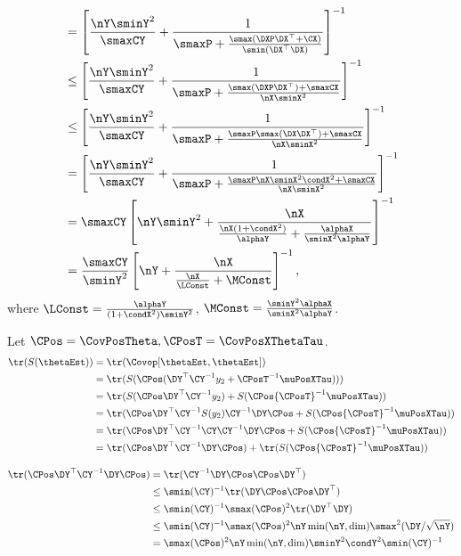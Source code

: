 \begin{align}
&= \left[ \frac{\nY\sminY^2}{\smaxCY} + \frac{1}{\smaxP + \frac{\smax(\DXP\DX^\top + \CX)}{\smin(\DX^\top \DX)}} \right]^{-1} \\
&\le \left[ \frac{\nY\sminY^2}{\smaxCY} + \frac{1}{\smaxP +\frac{\smax(\DXP\DX^\top) +\smaxCX}{\nX \sminX^2}} \right]^{-1} \\
&\le \left[ \frac{\nY\sminY^2}{\smaxCY} + \frac{1}{\smaxP +\frac{\smaxP\smax(\DX\DX^\top) + \smaxCX}{\nX \sminX^2}} \right]^{-1} \\
&= \left[ \frac{\nY\sminY^2}{\smaxCY} + \frac{1}{\smaxP +\frac{\smaxP\nX \sminX^2 \condX^2 + \smaxCX}{\nX \sminX^2}} \right]^{-1} \\
&=\smaxCY
\left[ \nY\sminY^2 + 
\frac{\nX}{\frac{\nX (1+\condX^2)}{\alphaY} + \frac{\alphaX}{\sminX^2 \alphaY}} \right]^{-1} \\
&=\frac{\smaxCY}{\sminY^2}
\left[ \nY + 
\frac{\nX}{\frac{\nX}{\LConst} + \MConst} \right]^{-1},
\end{align}
where $\LConst = \frac{\alphaY}{(1 + \condX^2)\sminY^2}$, $\MConst = \frac{\sminY^2 \alphaX}{\sminX^2 \alphaY}$.

Let $\CPos = \CovPosTheta, \CPosT = \CovPosXThetaTau$.
\begin{align}
\tr(S(\thetaEst)) &= \tr(\Covop [\thetaEst, \thetaEst]) \\
&=\tr(S(\CPos (\DY^\top \CY^{-1} y_2 + {\CPosT}^{-1} \muPosXTau)))\\
&=\tr(S(\CPos \DY^\top \CY^{-1} y_2) + S(\CPos {\CPosT}^{-1}  \muPosXTau))\\
&=\tr(\CPos \DY^\top \CY^{-1} S(y_2) \CY^{-1} \DY \CPos + S(\CPos {\CPosT}^{-1} \muPosXTau))\\
&=\tr(\CPos \DY^\top \CY^{-1} \CY \CY^{-1} \DY \CPos + S(\CPos {\CPosT}^{-1} \muPosXTau))\\
&=\tr(\CPos \DY^\top \CY^{-1} \DY \CPos) + \tr(S(\CPos {\CPosT}^{-1} \muPosXTau))\\
\end{align}

\begin{align}
\tr(\CPos \DY^\top \CY^{-1} \DY \CPos) &= \tr( \CY^{-1} \DY \CPos\CPos \DY^\top)\\
&\le \smin(\CY)^{-1} \tr(\DY \CPos\CPos \DY^\top)\\
&\le \smin(\CY)^{-1} \smax(\CPos)^2 \tr(\DY^\top \DY)\\
&\le \smin(\CY)^{-1} \smax(\CPos)^2 \nY \min(\nY, \dim) \smax^2(\DY/\sqrt{\nY}) \\
&= \smax(\CPos)^2 \nY \min(\nY, \dim) \sminY^2 \condY^2 \smin(\CY)^{-1}
\end{align}

